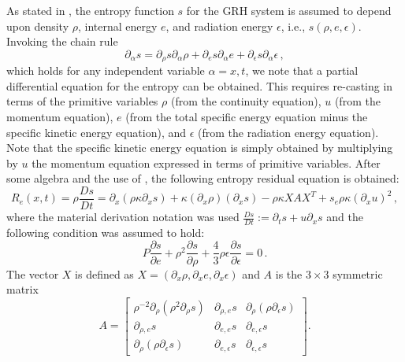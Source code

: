 \documentclass[review]{elsarticle}
\begin{document}
As stated in , the entropy function $s$ for the GRH system is assumed to depend upon density $\rho$, internal energy $e$, and radiation energy $\epsilon$, i.e., $s( \rho, e, \epsilon)$. Invoking the chain rule
%
\begin{equation}
\label{eq:app_equ2}
\partial_{\alpha} s = \partial_{\rho} s \partial_{\alpha} \rho +  \partial_{e} s \partial_{\alpha}e +  \partial_{\epsilon} s \partial_{\alpha} \epsilon \,,
\end{equation}
 which holds for any independent variable $\alpha=x,t$, we note that a partial differential equation for the entropy can be obtained. This requires
re-casting   in terms of the primitive variables $\rho$ (from  the continuity equation), $u$  (from  the momentum equation),
$e$ (from the total specific energy equation minus the specific kinetic energy equation), and $\epsilon$ (from the radiation energy equation). Note that 
the specific kinetic energy equation is simply obtained by multiplying by $u$ the momentum equation expressed in terms of primitive variables. After some algebra and the use of , the following entropy residual equation is obtained:
%
\begin{equation} \label{eq:app_entr_eq_non_equil}
R_e(x,t) = \rho \frac{Ds}{Dt} = \partial_x \left( \rho \kappa \partial_x s \right) + \kappa \left(\partial_x \rho\right) \left( \partial_x s\right) - \rho \kappa X A X^T  + s_e \rho \kappa (\partial_x u)^2 \, ,
\end{equation} 
% 
where the material derivation notation was used $\frac{Ds}{Dt} := \partial_t s + u \partial_x s$ and the following condition was assumed to hold:
%
\begin{equation} \label{eq:visc_reg_assumptions}
P \frac{\partial s}{\partial e} + \rho^2 \frac{\partial s}{\partial \rho} + \frac{4}{3} \rho \epsilon \frac{\partial s}{\partial \epsilon} = 0 \,. 
\end{equation}
%
The vector $X$ is defined as $X=\left( \partial_x \rho, \partial_x e, \partial_x \epsilon \right)$ and $A$ is the $3 \times 3$ symmetric matrix
%
 \begin{equation}
 A = 
 \left[
 \begin{array}{ccc}
\rho^{-2}\partial_{\rho} \left( \rho^2 \partial_{\rho} s \right) & \partial_{\rho,e} s & \partial_{\rho} \left( \rho \partial_{\epsilon} s \right) \\
 \partial_{\rho,e} s & \partial_{e,e} s & \partial_{e,\epsilon} s \\
 \partial_{\rho} \left( \rho \partial_{\epsilon} s \right) & \partial_{e,\epsilon} s & \partial_{\epsilon,\epsilon} s
 \end{array}
 \right] .
 \end{equation}
\end{document}

